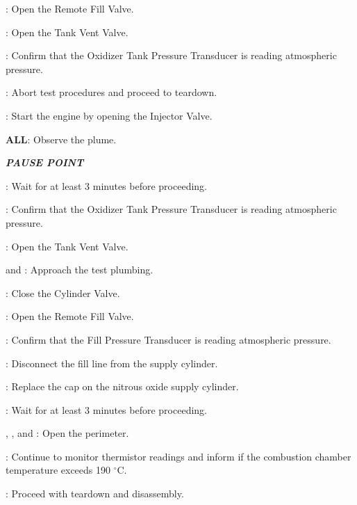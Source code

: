 \begin{checklist}
\begin{checklist}
\begin{checklist}[label=$\bullet$]
\begin{checklist}
                \item \control{}: Open the Remote Fill Valve.
                \item \control{}: Open the Tank Vent Valve.
                \item \daq{}: Confirm that the Oxidizer Tank Pressure Transducer is reading atmospheric pressure.
                \item \ops{}: Abort test procedures and proceed to teardown.
            \end{checklist}
        \end{checklist}
        \item \control{}: Start the engine by opening the Injector Valve.
    \end{checklist}
    \item \textbf{ALL}: Observe the plume.
    \item \textbf{\textit{PAUSE POINT}}
    \item \ops{}: Wait for at least 3 minutes before proceeding.
    \item \daq{}: Confirm that the Oxidizer Tank Pressure Transducer is reading atmospheric pressure.
    \item \control{}: Open the Tank Vent Valve.
    \item \primary{} and \secondary{}: Approach the test plumbing.
    \item \primary{}: Close the Cylinder Valve.
    \item \control{}: Open the Remote Fill Valve.
    \item \daq{}: Confirm that the Fill Pressure Transducer is reading atmospheric pressure.
    \item \primary{}: Disconnect the fill line from the supply cylinder.
    \item \primary{}: Replace the cap on the nitrous oxide supply cylinder.
    \item \ops{}: Wait for at least 3 minutes before proceeding.
    \item \peri{}, \perii{}, and \periii{}: Open the perimeter.
    \item \daq{}: Continue to monitor thermistor readings and inform \ops{} if the combustion chamber temperature exceeds 190 $^\circ$C.
    \item \ops{}: Proceed with teardown and disassembly.

\end{checklist}
\setcounter{checklistnum}{0}


